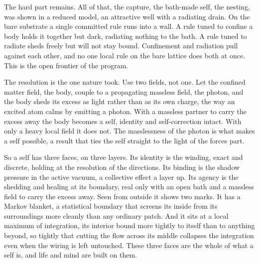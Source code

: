 The hard part remains. All of that, the capture, the bath-made self, the nesting, was shown in a reduced model, an attractive well with a radiating drain. On the bare substrate a single committed rule runs into a wall. A rule tuned to confine a body holds it together but dark, radiating nothing to the bath. A rule tuned to radiate sheds freely but will not stay bound. Confinement and radiation pull against each other, and no one local rule on the bare lattice does both at once. \cite{pollard2026vibetest} This is the open frontier of the program.

The resolution is the one nature took. Use two fields, not one. Let the confined matter field, the body, couple to a propagating massless field, the photon, and the body sheds its excess as light rather than as its own charge, the way an excited atom calms by emitting a photon. With a massless partner to carry the excess away the body becomes a self, identity and self-correction intact. With only a heavy local field it does not. The masslessness of the photon is what makes a self possible, a result that ties the self straight to the light of the forces part. \cite{pollard2026vibetest}

So a self has three faces, on three layers. Its identity is the winding, exact and discrete, holding at the resolution of the directions. Its binding is the shadow pressure in the active vacuum, a collective effect a layer up. Its agency is the shedding and healing at its boundary, real only with an open bath and a massless field to carry the excess away. Seen from outside it shows two marks. It has a Markov blanket, a statistical boundary that screens its inside from its surroundings more cleanly than any ordinary patch. \cite{pollard2026vibetest} And it sits at a local maximum of integration, its interior bound more tightly to itself than to anything beyond, so tightly that cutting the flow across its middle collapses the integration even when the wiring is left untouched. \cite{pollard2026vibetest} These three faces are the whole of what a self is, and life and mind are built on them.
